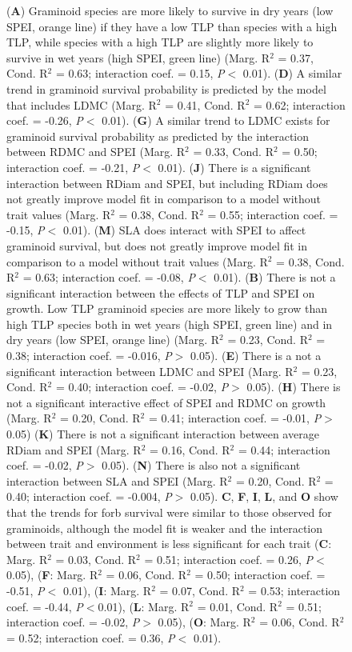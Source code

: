 \documentclass[12pt, letterpaper]{article}
\begin{document}
\begin{figure}
   \ContinuedFloat
   \caption{
(\textbf{A}) Graminoid species are more likely to survive in dry years (low SPEI, orange line) if they have a low TLP than species with a high TLP, while species with a high TLP are slightly more likely to survive in wet years (high SPEI, green line) (Marg. R$^2$ = 0.37, Cond. R$^2$ = 0.63; interaction coef. = 0.15, \textit{P}$<$ 0.01). (\textbf{D}) A similar trend in graminoid survival probability is predicted by the model that includes LDMC (Marg. R$^2$ = 0.41, Cond. R$^2$ = 0.62; interaction coef. = -0.26, \textit{P}$<$ 0.01). (\textbf{G}) A similar trend to LDMC exists for graminoid survival probability as predicted by the interaction between RDMC and SPEI (Marg. R$^2$ = 0.33, Cond. R$^2$ = 0.50; interaction coef. = -0.21, \textit{P}$<$ 0.01). (\textbf{J}) There is a significant interaction between RDiam and SPEI, but including RDiam does not greatly improve model fit in comparison to a model without trait values (Marg. R$^2$ = 0.38, Cond. R$^2$ = 0.55; interaction coef. = -0.15, \textit{P}$<$ 0.01). (\textbf{M}) SLA does interact with SPEI to affect graminoid survival, but does not greatly improve model fit in comparison to a model without trait values (Marg. R$^2$ = 0.38, Cond. R$^2$ = 0.63; interaction coef. = -0.08, \textit{P}$<$ 0.01).
(\textbf{B}) There is not a significant interaction between the effects of TLP and SPEI on growth. Low TLP graminoid species are more likely to grow than high TLP species both in wet years (high SPEI, green line) and in dry years (low SPEI, orange line) (Marg. R$^2$ = 0.23, Cond. R$^2$ = 0.38; interaction coef. = -0.016, \textit{P}$>$ 0.05). (\textbf{E}) There is a not a significant interaction between LDMC and SPEI (Marg. R$^2$ = 0.23, Cond. R$^2$ = 0.40; interaction coef. = -0.02, \textit{P}$>$ 0.05). (\textbf{H}) There is not a significant interactive effect of SPEI and RDMC on growth (Marg. R$^2$ = 0.20, Cond. R$^2$ = 0.41; interaction coef. = -0.01, \textit{P}$>$ 0.05) (\textbf{K}) There is not a significant interaction between average RDiam and SPEI (Marg. R$^2$ = 0.16, Cond. R$^2$ = 0.44; interaction coef. = -0.02, \textit{P}$>$ 0.05). (\textbf{N}) There is also not a significant interaction between SLA and SPEI (Marg. R$^2$ = 0.20, Cond. R$^2$ = 0.40; interaction coef. = -0.004, \textit{P}$>$ 0.05). 
\textbf{C}, \textbf{F}, \textbf{I}, \textbf{L}, and \textbf{O} show that the trends for forb survival were similar to those observed for graminoids, although the model fit is weaker and the interaction between trait and environment is less significant for each trait (\textbf{C}: Marg. R$^2$ = 0.03, Cond. R$^2$ = 0.51; interaction coef. = 0.26, \textit{P}$<$ 0.05), (\textbf{F}: Marg. R$^2$ = 0.06, Cond. R$^2$ = 0.50; interaction coef. = -0.51, \textit{P}$<$ 0.01), (\textbf{I}: Marg. R$^2$ = 0.07, Cond. R$^2$ = 0.53; interaction coef. = -0.44, \textit{P}$<$0.01), (\textbf{L}: Marg. R$^2$ = 0.01, Cond. R$^2$ = 0.51; interaction coef. = -0.02, \textit{P}$>$ 0.05), (\textbf{O}: Marg. R$^2$ = 0.06, Cond. R$^2$ = 0.52; interaction coef. = 0.36, \textit{P}$<$ 0.01). 
}
\end{figure}
\end{document}
